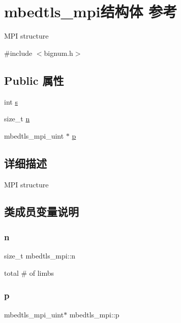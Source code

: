 \hypertarget{structmbedtls__mpi}{}\section{mbedtls\+\_\+mpi结构体 参考}
\label{structmbedtls__mpi}


M\+PI structure  




{\ttfamily \#include $<$bignum.\+h$>$}

\subsection*{Public 属性}
\begin{DoxyCompactItemize}
\item 
int \hyperlink{structmbedtls__mpi_a98e0b295f053643085b1c756857c3477}{s}
\item 
size\+\_\+t \hyperlink{structmbedtls__mpi_a09fab4ba4d22d47ecf987e9cf2dccf13}{n}
\item 
mbedtls\+\_\+mpi\+\_\+uint $\ast$ \hyperlink{structmbedtls__mpi_af0af10ca10e97e8bce41da588600836e}{p}
\end{DoxyCompactItemize}


\subsection{详细描述}
M\+PI structure 

\subsection{类成员变量说明}
\mbox{\label{structmbedtls__mpi_a09fab4ba4d22d47ecf987e9cf2dccf13}} 
\subsubsection{\texorpdfstring{n}{n}}
{\footnotesize\ttfamily size\+\_\+t mbedtls\+\_\+mpi\+::n}

total \# of limbs \mbox{\label{structmbedtls__mpi_af0af10ca10e97e8bce41da588600836e}} 
\subsubsection{\texorpdfstring{p}{p}}
{\footnotesize\ttfamily mbedtls\+\_\+mpi\+\_\+uint$\ast$ mbedtls\+\_\+mpi\+::p}

